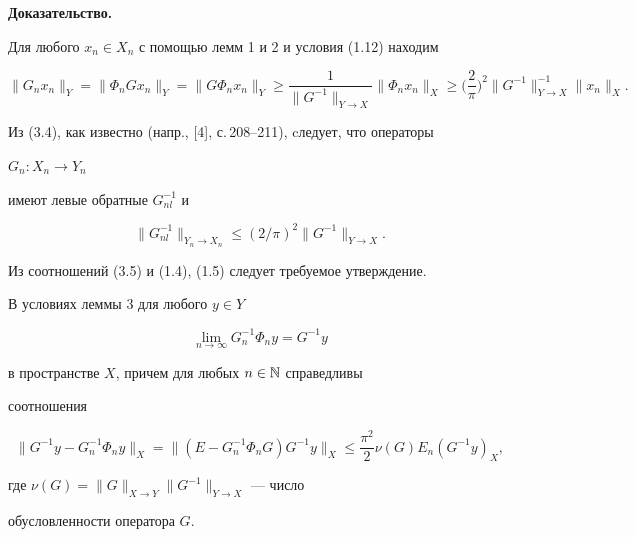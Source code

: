 {\bf Доказательство.}


Для любого $x_n \in X_n$ с помощью лемм 1 и 2 и условия (1.12) находим


\begin{equation}


\|G_n x_n\|_Y=\|\Phi_n Gx_n \|_Y=\|G\Phi_n x_n\|_Y \ge


\frac{1}{\|G^{-1}\|_{Y \to X}} \|\Phi_n x_n\|_X \ge


\bigg(\frac{2}{\pi} \bigg)^2 \|G^{-1}\|^{-1}_{Y \to X}\|x_n\|_X.


\end{equation}


Из (3.4), как известно (напр., [4], с.\,208--211), cледует, что операторы


$G_n :X_n \to Y_n $


имеют левые обратные $ G^{-1}_{nl} $ и


\begin{equation}


\|G^{-1}_{nl}\|_{Y_n \to X_n} \le (2/\pi)^2\|G^{-1}\|_{Y


\to X}.


\end{equation}


Из соотношений (3.5) и (1.4), (1.5) следует требуемое утверждение.





\begin{lem}


В условиях леммы $3$ для любого $y \in Y$


\begin{equation}


\lim_{n \to \infty} G_{n}^{-1}\Phi_n y=G^{-1}y


\end{equation}


в пространстве $X$, причем для любых $n \in\Bbb N$ справедливы


соотношения


\begin{equation}


\|G^{-1}y - G^{-1}_{n}\Phi_{n}y\|_{X}=\|(E-G^{-1}_{n}\Phi_{n}G)


G^{-1}y \|_{X}\le \frac{\pi^2}{2}\nu(G)E_n (G^{-1}y)_{X},


\end{equation}


где $\nu(G)=\|G\|_{X \to Y} \|G^{-1}\|_{Y \to X}$ --- число


обусловленности оператора $G$.


\end{lem}





